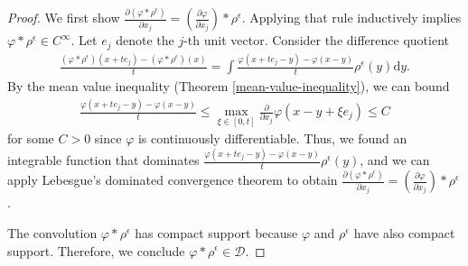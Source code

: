 \begin{proof}
    We first show \(\frac{\partial (\varphi * \rho^{\epsilon})}{\partial x_j} = \left(\frac{\partial \varphi}{\partial x_j}\right) * \rho^{\epsilon}\). Applying that rule inductively implies \(\varphi * \rho^{\epsilon} \in C^{\infty}\). Let \(e_j\) denote the \(j\)-th unit vector. Consider the difference quotient
    \begin{align*}
        \frac{(\varphi * \rho^\epsilon)(x + te_j) - (\varphi * \rho^\epsilon)(x)}{t} = \int \frac{\varphi(x+te_j - y) - \varphi(x-y)}{t}\rho^{\epsilon}(y) \mathrm{d}y.
    \end{align*}
    By the mean value inequality (Theorem \ref{mean-value-inequality}), we can bound
    \begin{align*}
        \frac{\varphi (x + te_j - y) - \varphi (x-y)}{t} \leq \max_{\xi \in [0,t]}\frac{\partial}{\partial x_j}\varphi(x - y + \xi e_j) \leq C
    \end{align*}
    for some \(C > 0\) since \(\varphi\) is continuously differentiable. Thus, we found an integrable function that dominates \(\frac{\varphi(x+te_j - y) - \varphi(x-y)}{t}\rho^{\epsilon}(y)\), and we can apply Lebesgue's dominated convergence theorem to obtain \(\frac{\partial (\varphi * \rho^{\epsilon})}{\partial x_j} = \left(\frac{\partial \varphi}{\partial x_j}\right) * \rho^{\epsilon}\).

    The convolution \(\varphi * \rho^{\epsilon}\) has compact support because \(\varphi\) and \(\rho^{\epsilon}\) have also compact support. Therefore, we conclude \(\varphi * \rho^{\epsilon} \in \mathcal{D}\).


\end{proof}
